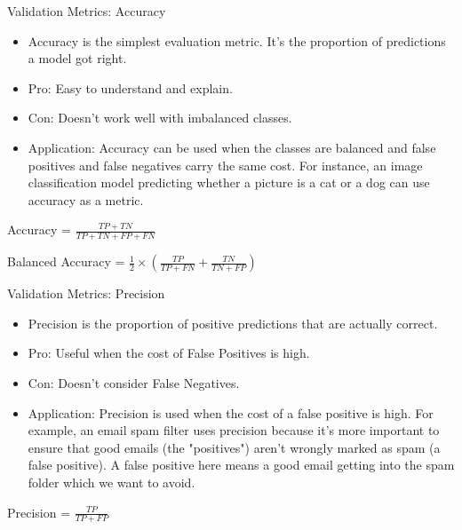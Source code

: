 \documentclass[aspectratio=169]{../latex_main/tntbeamer}  %
\begin{document}
        \begin{frame}[c]{Validation Metrics: Accuracy}

        \begin{itemize}
            \item Accuracy is the simplest evaluation metric. It's the proportion of predictions a model got right.
            \item \alert{Pro:} Easy to understand and explain.
            \item \alert{Con:} Doesn't work well with imbalanced classes.
            \item \alert{Application:} Accuracy can be used when the classes are balanced and false positives and false negatives carry the same cost. For instance, an image classification model predicting whether a picture is a cat or a dog can use accuracy as a metric.
        \end{itemize}

        \centering
        \bigskip

        Accuracy = $\frac{{TP + TN}}{{TP + TN + FP + FN}}$

        \medskip
        Balanced Accuracy = $\frac{1}{2} \times \left(\frac{{TP}}{{TP + FN}} + \frac{{TN}}{{TN + FP}}\right)$

	\end{frame}

         \begin{frame}[c]{Validation Metrics: Precision}

        \begin{itemize}
            \item Precision is the proportion of positive predictions that are actually correct.
            \item \alert{Pro:} Useful when the cost of False Positives is high.
            \item \alert{Con:} Doesn't consider False Negatives.
            \item \alert{Application:} Precision is used when the cost of a false positive is high. For example, an email spam filter uses precision because it's more important to ensure that good emails (the "positives") aren't wrongly marked as spam (a false positive). A false positive here means a good email getting into the spam folder which we want to avoid.
        \end{itemize}

        \centering
        \bigskip

        Precision = $\frac{{TP}}{{TP + FP}}$

	\end{frame}
\end{document}

